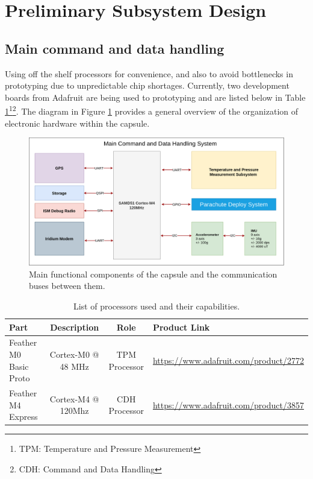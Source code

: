 \documentclass{article}
\begin{document}
\section{Preliminary Subsystem Design}
\label{sec:ss-design}

\subsection{Main command and data handling}

Using off the shelf processors for convenience, and also to avoid bottlenecks in prototyping due to unpredictable chip shortages. Currently, two development boards from Adafruit are being used to prototyping and are listed below in Table \ref{tab:processors}\footnote{TPM: Temperature and Pressure Measurement}\footnote{CDH: Command and Data Handling}. The diagram in Figure \ref{fig:main-overview} provides a general overview of the organization of electronic hardware within the capsule. 

\begin{figure}[h!]
	\centering
	\includegraphics[width=\textwidth]{images/amtps-main-system.png}
	\caption{Main functional components of the capsule and the communication buses between them.}
	\label{fig:main-overview}
\end{figure}


\begin{table}[h!]	
	\caption{List of processors used and their capabilities.}
	\begin{tabular}{l | c c m{5cm}}
		Part & Description & Role & Product Link \\
		\hline
		Feather M0 Basic Proto & Cortex-M0 @ 48 MHz & TPM Processor & \url{https://www.adafruit.com/product/2772}\\
		Feather M4 Express & Cortex-M4 @ 120Mhz & CDH Processor & \url{https://www.adafruit.com/product/3857} 
	\end{tabular}
	\label{tab:processors}
\end{table}
\end{document}
